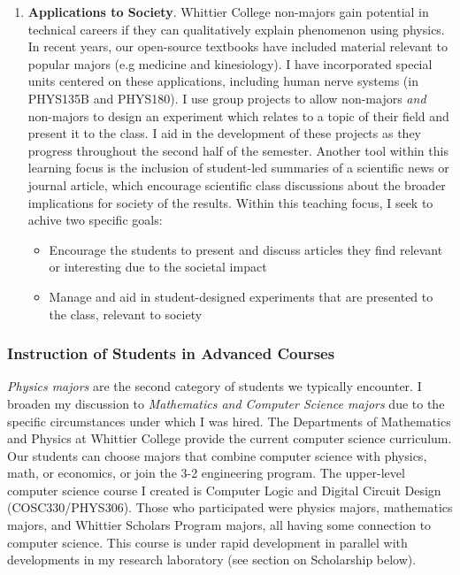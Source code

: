 \documentclass[../../main.tex]{subfiles}
\begin{document}
\begin{enumerate}
\item \textbf{Applications to Society}. Whittier College non-majors gain potential in technical careers if they can qualitatively explain phenomenon using physics.  In recent years, our open-source textbooks \cite{openstax1} \cite{openstax2} have included material relevant to popular majors (e.g medicine and kinesiology). I have incorporated special units centered on these applications, including human nerve systems (in PHYS135B and PHYS180).  I use group projects to allow non-majors \textit{and} non-majors to design an experiment which relates to a topic of their field and present it to the class.  I aid in the development of these projects as they progress throughout the second half of the semester.  Another tool within this learning focus is the inclusion of student-led summaries of a scientific news or journal article, which encourage scientific class discussions about the broader implications for society of the results.  Within this teaching focus, I seek to achive two specific goals:

\begin{itemize}
\item Encourage the students to present and discuss articles they find relevant or interesting due to the societal impact %
\item Manage and aid in student-designed experiments that are presented to the class, relevant to society %
\end{itemize}


\end{enumerate}

\subsubsection{Instruction of Students in Advanced Courses}

\label{sec:teaching_phil2}

\textit{Physics majors} are the second category of students we typically encounter.  I broaden my discussion to \textit{Mathematics and Computer Science majors} due to the specific circumstances under which I was hired.  The Departments of Mathematics and Physics at Whittier College provide the current computer science curriculum.  Our students can choose majors that combine computer science with physics, math, or economics, or join the 3-2 engineering program.  The upper-level computer science course I created is Computer Logic and Digital Circuit Design (COSC330/PHYS306).  Those who participated were physics majors, mathematics majors, and Whittier Scholars Program majors, all having some connection to computer science.  This course is under rapid development in parallel with developments in my research laboratory (see section on Scholarship below). \\ \hspace{0.1cm}
\end{document}
